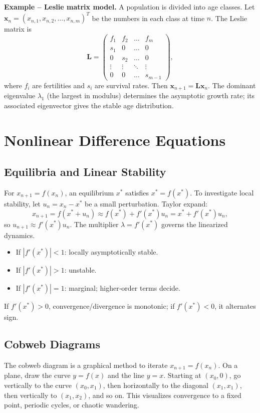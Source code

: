 \documentclass[12pt,a4paper]{book}
\begin{document}
\textbf{Example – Leslie matrix model.}
A population is divided into age classes. Let $\mathbf{x}_n = (x_{n,1}, x_{n,2}, \dots, x_{n,m})^T$ be the numbers in each class at time $n$. The Leslie matrix is
\[
\mathbf{L} = \begin{pmatrix}
f_1 & f_2 & \dots & f_m \\
s_1 & 0 & \dots & 0 \\
0 & s_2 & \dots & 0 \\
\vdots & \vdots & \ddots & \vdots \\
0 & 0 & \dots & s_{m-1} \! \end{pmatrix},
\]
where $f_i$ are fertilities and $s_i$ are survival rates. Then $\mathbf{x}_{n+1} = \mathbf{L} \mathbf{x}_n$. The dominant eigenvalue $\lambda_1$ (the largest in modulus) determines the asymptotic growth rate; its associated eigenvector gives the stable age distribution.

\section{Nonlinear Difference Equations}

\subsection{Equilibria and Linear Stability}
For $x_{n+1} = f(x_n)$, an equilibrium $x^*$ satisfies $x^* = f(x^*)$. To investigate local stability, let $u_n = x_n - x^*$ be a small perturbation. Taylor expand:
\[
x_{n+1} = f(x^*+u_n) \approx f(x^*) + f'(x^*) u_n = x^* + f'(x^*) u_n,
\]
so $u_{n+1} \approx f'(x^*) u_n$. The multiplier $\lambda = f'(x^*)$ governs the linearized dynamics.
\begin{itemize}
    \item If $|f'(x^*)| < 1$: locally asymptotically stable.
    \item If $|f'(x^*)| > 1$: unstable.
    \item If $|f'(x^*)| = 1$: marginal; higher‑order terms decide.
\end{itemize}
If $f'(x^*) > 0$, convergence/divergence is monotonic; if $f'(x^*) < 0$, it alternates sign.

\subsection{Cobweb Diagrams}
The cobweb diagram is a graphical method to iterate $x_{n+1}=f(x_n)$. On a plane, draw the curve $y = f(x)$ and the line $y=x$. Starting at $(x_0,0)$, go vertically to the curve $(x_0, x_1)$, then horizontally to the diagonal $(x_1,x_1)$, then vertically to $(x_1, x_2)$, and so on. This visualizes convergence to a fixed point, periodic cycles, or chaotic wandering.
\end{document}
